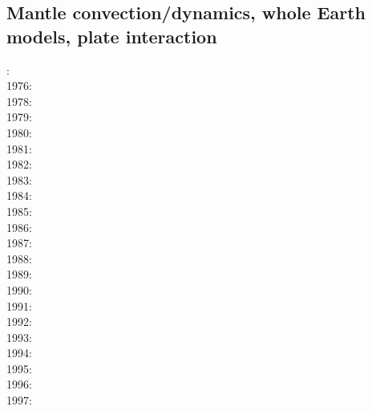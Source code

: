 \subsection*{Mantle convection/dynamics, whole Earth models, plate interaction}

: \cite{hemw75}\\
1976: \cite{mcri76}\\
1978: \cite{mahz78}\cite{hsui78}\\
1979: \cite{ludt79}\cite{buss79}\\
1980: \cite{olco80}\cite{jamc80}\cite{scsc80}\\
1981: \cite{buss81}\cite{jasc81}\\
1982: \cite{jape82}\cite{homc82}\\
1983: \cite{hous83}\cite{hous83b}\cite{chri83}\cite{mcke83}\\
1984: \cite{olyb84}\cite{jarv84}\cite{haeb84}\cite{harp84}\cite{davi84}\cite{boas84}\cite{chri84}
      \cite{moca84}\cite{flyu84}\\
1985: \cite{jarv85}\cite{baum85}\cite{chri85}\cite{csra85}\\
1986: \cite{davi86}\cite{guda86}\cite{quys86}\\
1987: \cite{yuqh87}\\
1988: \cite{haeb88}\\
1989: \cite{besg89}\cite{schm89}\\
1990: \cite{trab90}\cite{gurn90}\cite{ketu90}\\
1991: \cite{chha91}\cite{mawe91}\cite{gaot91}\\
1992: \cite{besg92}\cite{mayw92}\cite{vayv92}\\
1993: \cite{zhch93}\cite{jarv93}\cite{tack93}\cite{bucc93}\cite{carm93}\cite{vavy93}\cite{tasg93}
      \cite{zhgu93}\cite{mamc93}\cite{zebi93}\\
1994: \cite{haeb94}\cite{chho94}\cite{tasg94}\cite{itki94}\cite{leka94}\\
1995: \cite{zhgu95}\cite{vayv95}\cite{buba95}\cite{rasz95}\cite{berc95}\cite{puhj95}\cite{pujh95}\\
1996: \cite{zhyu96}\cite{hond96}\cite{rytr96a}\cite{rytr96b}\cite{tack96}\cite{trbo96}
      \cite{birg96}\cite{burb96}\cite{kafo96}\cite{guez96}\cite{vayu96}\cite{rasz96}\cite{rasz96b}
      \cite{leka96}\\
1997: \cite{hond97}\cite{iwho97}\cite{burb97}\cite{mole97}\cite{somo97}\cite{rats97}\\
